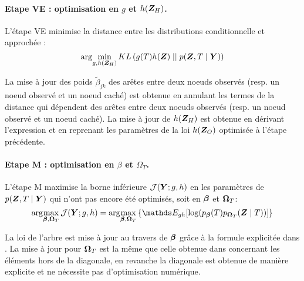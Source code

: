\paragraph{Etape VE : optimisation en $g$ et $h(\boldsymbol{Z}_H)$.}
L'étape VE minimise la distance entre les distributions conditionnelle et approchée :
$$  \arg\!\min_{g,h(\boldsymbol{Z}_H)} KL\left(g(T)h(\boldsymbol{Z}) \mid\mid p(\boldsymbol{Z},T\mid \boldsymbol{Y})\right)$$

La mise à jour des poids $\widetilde{\beta}_{jk}$ des arêtes entre deux noeuds observés (resp. un noeud observé et un noeud caché) est obtenue en annulant les termes de la distance qui dépendent des arêtes entre deux noeuds observés (resp. un noeud observé et un noeud caché). 
La mise à jour de $h(\boldsymbol{Z}_H)$ est obtenue en dérivant l'expression et en reprenant les paramètres de la loi $h(\boldsymbol{Z}_O)$ optimisée à l'étape précédente.

\paragraph{Etape M : optimisation en $\beta$ et $\Omega_T$.}

L'étape M maximise la borne inférieure $\mathcal{J}(\boldsymbol{Y} ; g,h)$ en les paramètres de $p(\boldsymbol{Z},T\mid \boldsymbol{Y})$ qui n'ont pas encore été optimisés, soit en $\boldsymbol{\beta}$ et $\boldsymbol{\Omega}_T$:
$$ \argmax_{\betabf, \Omegabf_T} \mathcal{J}(\Ybf ; g,h) =\argmax_{\betabf, \Omegabf_T} \left\{ \Esp_{gh} [\log (p_{\betabf}(T) p_{\Omegabf_T}(\Zbf\mid T))]\right\} $$

La loi de l'arbre est mise à jour au travers de $\boldsymbol{\beta}$ grâce à la formule explicitée dans \citet{MRA20}. La mise à jour pour  $\boldsymbol{\Omega}_T$ est la même que celle obtenue dans \citet{genvieve} concernant les éléments hors de la diagonale, en revanche la diagonale est  obtenue de manière explicite et ne nécessite pas d'optimisation numérique.